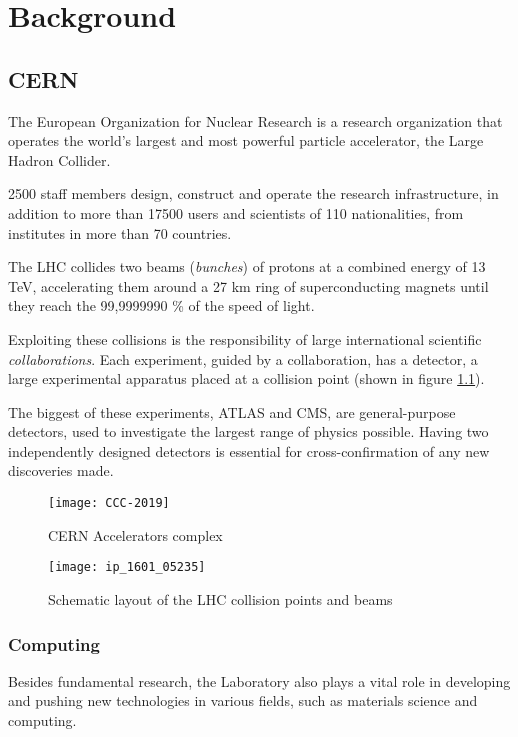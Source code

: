 \chapter{Background}

\section{CERN}

The European Organization for Nuclear Research is a research organization that operates the world’s largest and most powerful particle accelerator, the Large Hadron Collider.

2500 staff members design, construct and operate the research infrastructure, in addition to more than 17500 users and scientists of 110 nationalities, from institutes in more than 70 countries.

The LHC collides two beams (\textit{bunches}) of protons at a combined energy of 13 TeV, accelerating them around a 27 km ring of superconducting magnets until they reach the 99,9999990 \% of the speed of light.

Exploiting these collisions is the responsibility of large international scientific \textit{collaborations}. Each experiment, guided by a collaboration, has a detector, a large experimental apparatus placed at a collision point (shown in figure \ref{fig:cern_complex}).

The biggest of these experiments, ATLAS and CMS, are general-purpose detectors, used to investigate the largest range of physics possible. Having two independently designed detectors is essential for cross-confirmation of any new discoveries made.

\begin{figure}
	\centerline{
		\texttt{[image: CCC-2019]}}
	\caption{CERN Accelerators complex \cite{Mobs:2684277}}
	\label{fig:cern_complex}
\end{figure}

\begin{figure}
	\centerline{
		\texttt{[image: ip\_1601\_05235]}}
	\caption{Schematic layout of the LHC collision points and beams \cite{Herr:1982430}}
	\label{fig:ip}
\end{figure}

\subsection{Computing}

Besides fundamental research, the Laboratory also plays a vital role in developing and pushing new technologies in various fields, such as materials science and computing.

